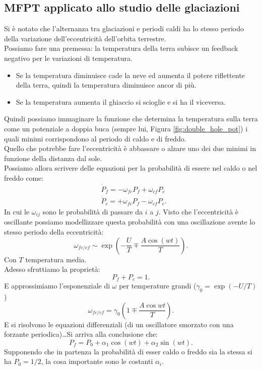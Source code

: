 \subsection{MFPT applicato allo studio delle glaciazioni}%
\label{sub:MFPT applicato allo studio delle glaciazioni}
Si è notato che l'alternanza tra glaciazioni e periodi caldi ha lo stesso periodo della variazione dell'eccentricità dell'orbita terrestre.\\
Possiamo fare una premessa: la temperatura della terra subisce un feedback negativo per le variazioni di temperatura.
\begin{itemize}
    \item Se la temperatura diminuisce cade la neve ed aumenta il potere riflettente della terra, quindi la temperatura diminuisce ancor di più.
    \item Se la temperatura aumenta il ghiaccio si scioglie e si ha il viceversa.
\end{itemize}
Quindi possiamo immaginare la funzione che determina la temperatura sulla terra come un potenziale a doppia buca (sempre lui, Figura \ref{fig:double_hole_pot}) i quali minimi corrispondono al periodo di caldo e di freddo.\\
Quello che potrebbe fare l'eccentricità è abbassare o alzare uno dei due minimi in funzione della distanza dal sole.\\
Possiamo allora scrivere delle equazioni per la probabilità di essere nel caldo o nel freddo come:
\[\begin{aligned}
    &\dot{P}_f = - \omega_{fc}P_f + \omega_{cf}P_c\\
    & \dot{P}_c =  +\omega_{fc}P_f - \omega_{cf}P_c
.\end{aligned}\]
In cui le $\omega_{ij}$ sono le probabilità di passare da $i$ a $j$.
Visto che l'eccentricità è oscillante possiamo modellizzare questa probabilità con una oscillazione avente lo stesso periodo della eccentricità:
\[
    \omega_{fc /cf} \sim \exp\left(-\frac{U}{T}\mp \frac{A\cos (wt) }{T}\right)
.\] 
Con $T$ temperatura media.\\
Adesso sfruttiamo la proprietà:
\[
    P_f + P_c = 1
.\] 
E approssimiamo l'esponenziale di $\omega$ per temperature grandi ($\gamma_0 = \exp (-U /T)$)
\[
    \omega_{fc/cf} = \gamma_0\left(1\mp \frac{A\cos wt}{T}\right)
.\] 
E si risolvono le equazioni differenziali (di un oscillatore smorzato con una forzante periodica)\ldots Si arriva alla conclusione che:
\[
    P_f = P_0 + \alpha_1 \cos (wt) + \alpha_2 \sin (wt) 
.\] 
Supponendo che in partenza la probabilità di esser caldo o freddo sia la stessa si ha $P_0 = 1 /2$, la cosa importante sono le costanti $\alpha_i$.\\
